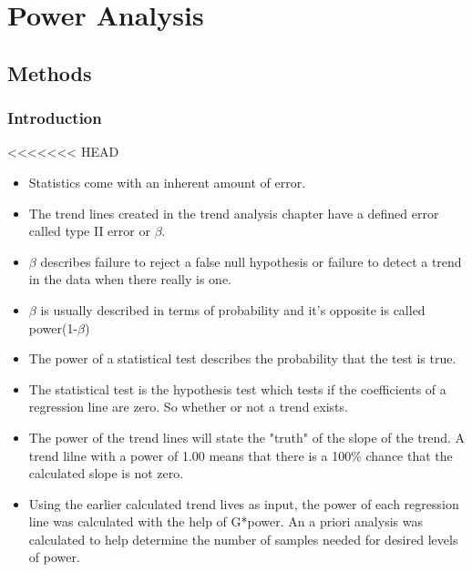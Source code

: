 \chapter{Power Analysis} \label{ch:poweranslysis}

\section{Methods}

\subsection{Introduction}
<<<<<<< HEAD
\begin{itemize}
	\item Statistics come with an inherent amount of error.
	\item The trend lines created in the trend analysis chapter have a defined error called type II error or $\beta$.
	\item $\beta$ describes failure to reject a false null hypothesis or failure to detect a trend in the data when there really is one.
	\item $\beta$ is usually described in terms of probability and it's opposite is called power(1-$\beta$)
	\item The power of a statistical test describes the probability that the test is true.
	\item The statistical test is the hypothesis test which tests if the coefficients of a regression line are zero.  So whether or not a trend exists.
	\item The power of the trend lines will state the "truth" of the slope of the trend.  A trend lilne with a power of 1.00 means that there is a 100$\%$ chance that the calculated slope is not zero.
	\item Using the earlier calculated trend lives as input, the power of each regression line was calculated with the help of G*power.  An a priori analysis was calculated to help determine the number of samples needed for desired levels of power.
\end{itemize}
